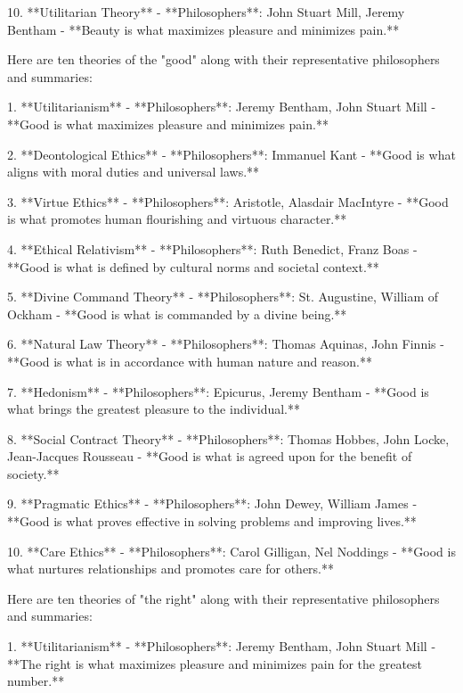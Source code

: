 10. **Utilitarian Theory**  
    - **Philosophers**: John Stuart Mill, Jeremy Bentham  
    - **Beauty is what maximizes pleasure and minimizes pain.**



Here are ten theories of the "good" along with their representative philosophers and summaries:

1. **Utilitarianism**  
   - **Philosophers**: Jeremy Bentham, John Stuart Mill  
   - **Good is what maximizes pleasure and minimizes pain.**

2. **Deontological Ethics**  
   - **Philosophers**: Immanuel Kant  
   - **Good is what aligns with moral duties and universal laws.**

3. **Virtue Ethics**  
   - **Philosophers**: Aristotle, Alasdair MacIntyre  
   - **Good is what promotes human flourishing and virtuous character.**

4. **Ethical Relativism**  
   - **Philosophers**: Ruth Benedict, Franz Boas  
   - **Good is what is defined by cultural norms and societal context.**

5. **Divine Command Theory**  
   - **Philosophers**: St. Augustine, William of Ockham  
   - **Good is what is commanded by a divine being.**

6. **Natural Law Theory**  
   - **Philosophers**: Thomas Aquinas, John Finnis  
   - **Good is what is in accordance with human nature and reason.**

7. **Hedonism**  
   - **Philosophers**: Epicurus, Jeremy Bentham  
   - **Good is what brings the greatest pleasure to the individual.**

8. **Social Contract Theory**  
   - **Philosophers**: Thomas Hobbes, John Locke, Jean-Jacques Rousseau  
   - **Good is what is agreed upon for the benefit of society.**

9. **Pragmatic Ethics**  
   - **Philosophers**: John Dewey, William James  
   - **Good is what proves effective in solving problems and improving lives.**

10. **Care Ethics**  
    - **Philosophers**: Carol Gilligan, Nel Noddings  
    - **Good is what nurtures relationships and promotes care for others.**


Here are ten theories of "the right" along with their representative philosophers and summaries:

1. **Utilitarianism**  
   - **Philosophers**: Jeremy Bentham, John Stuart Mill  
   - **The right is what maximizes pleasure and minimizes pain for the greatest number.**

